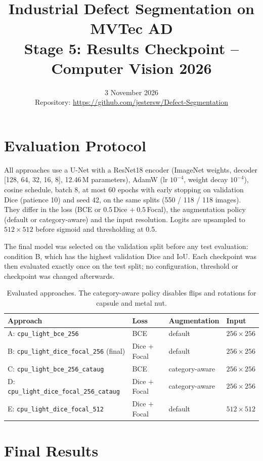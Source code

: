 \documentclass[11pt,a4paper]{article}
\title{\textbf{Industrial Defect Segmentation on MVTec AD}\\[2pt]\large Stage 5: Results Checkpoint -- Computer Vision 2026}
\date{3 November 2026\\[2pt]\small Repository: \url{https://github.com/jestersw/Defect-Segmentation}}
\begin{document}
\maketitle
\vspace{-1.5em}

\section{Evaluation Protocol}

All approaches use a U-Net with a ResNet18 encoder (ImageNet weights, decoder [128, 64, 32, 16, 8], 12.46\,M parameters), AdamW (lr $10^{-4}$, weight decay $10^{-4}$), cosine schedule, batch 8, at most 60 epochs with early stopping on validation Dice (patience 10) and seed 42, on the same splits (550 / 118 / 118 images). They differ in the loss (BCE or $0.5\,$Dice $+\ 0.5\,$Focal), the augmentation policy (default or category-aware) and the input resolution. Logits are upsampled to $512\times512$ before sigmoid and thresholding at 0.5.

The final model was selected on the validation split before any test evaluation: condition B, which has the highest validation Dice and IoU. Each checkpoint was then evaluated exactly once on the test split; no configuration, threshold or checkpoint was changed afterwards.

\begin{table}[H]
\centering
\small
\begin{tabularx}{\linewidth}{lllX}
\toprule
Approach & Loss & Augmentation & Input \\
\midrule
A: \texttt{cpu\_light\_bce\_256} & BCE & default & $256\times256$ \\
B: \texttt{cpu\_light\_dice\_focal\_256} (final) & Dice + Focal & default & $256\times256$ \\
C: \texttt{cpu\_light\_bce\_256\_cataug} & BCE & category-aware & $256\times256$ \\
D: \texttt{cpu\_light\_dice\_focal\_256\_cataug} & Dice + Focal & category-aware & $256\times256$ \\
E: \texttt{cpu\_light\_dice\_focal\_512} & Dice + Focal & default & $512\times512$ \\
\bottomrule
\end{tabularx}
\caption{Evaluated approaches. The category-aware policy disables flips and rotations for capsule and metal nut.}
\label{tab:approaches}
\end{table}

\section{Final Results}
\end{document}
